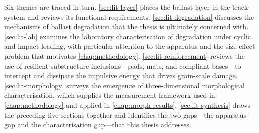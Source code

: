 Six themes are traced in turn. \cref{sec:lit-layer} places the ballast
layer in the track system and reviews its functional requirements.
\cref{sec:lit-degradation} discusses the mechanisms of ballast degradation
that the thesis is ultimately concerned with. \cref{sec:lit-lab} examines
the laboratory characterisation of degradation under cyclic and impact
loading, with particular attention to the apparatus and the size-effect
problem that motivates \cref{chap:methodology}. \cref{sec:lit-reinforcement}
reviews the use of resilient substructure inclusions---pads, mats, and
compliant bases---to intercept and dissipate the impulsive energy that
drives grain-scale damage. \cref{sec:lit-morphology} surveys the emergence
of three-dimensional morphological characterisation, which supplies the
measurement framework used in \cref{chap:methodology} and applied in
\cref{chap:morph-results}. \cref{sec:lit-synthesis} draws the preceding
five sections together and identifies the two gaps---the apparatus gap
and the characterisation gap---that this thesis addresses.

